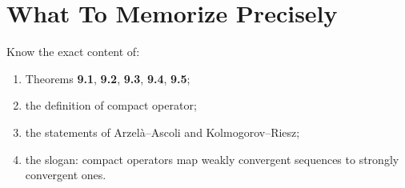 \documentclass[11pt]{article}
\begin{document}
\section{What To Memorize Precisely}

\begin{focusbox}
Know the exact content of:
\begin{enumerate}
\item Theorems \textbf{9.1}, \textbf{9.2}, \textbf{9.3}, \textbf{9.4}, \textbf{9.5};
\item the definition of compact operator;
\item the statements of Arzel\`a--Ascoli and Kolmogorov--Riesz;
\item the slogan: compact operators map weakly convergent sequences to strongly convergent ones.
\end{enumerate}
\end{focusbox}
\end{document}

